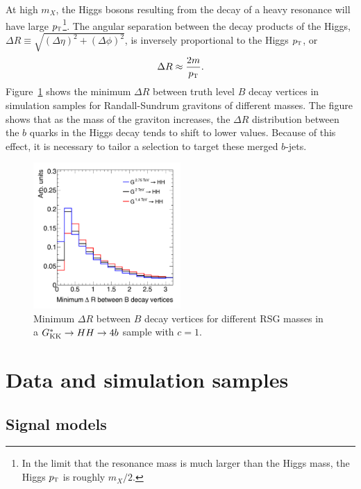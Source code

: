 At high $m_{X}$, the Higgs bosons resulting from the decay of a heavy resonance will have large $p_{\textrm{\footnotesize\sc t}}$\footnote{In the limit that the resonance mass is much larger than the Higgs mass, the Higgs $p_{\textrm{\footnotesize\sc t}}$ is roughly $m_{X}/2$.}. The angular separation between the decay products of the Higgs, $\Delta R \equiv \sqrt{(\Delta \eta)^2 + (\Delta \phi)^2}$, is inversely proportional to the Higgs $p_{\textrm{\footnotesize\sc t}}$, or 
%
\begin{equation}
\label{eqn:bb_dr}
\Delta R \approx \frac{2m}{p_{\textrm{\footnotesize\sc t}}}.
\end{equation}
%
Figure~\ref{fig:bb_dr} shows the minimum $\Delta R$ between truth level $B$ decay vertices in simulation samples for Randall-Sundrum gravitons of different masses. The figure shows that as the mass of the graviton increases, the $\Delta R$ distribution between the $b$ quarks in the Higgs decay tends to shift to lower values. Because of this effect, it is necessary to tailor a selection to target these merged $b$-jets. 

\begin{figure}[h!]
  \centering
  \captionsetup{justification=centering}

  \includegraphics[width=0.5\textwidth]{figures/min_dR_bb}
  \caption{Minimum $\Delta R$ between $B$ decay vertices for different RSG masses in a $G^*_{\rm KK} \to HH \to 4b$ sample with $c = 1$.}
  \label{fig:bb_dr}
\end{figure}

\section{Data and simulation samples}

\subsection{Signal models}

